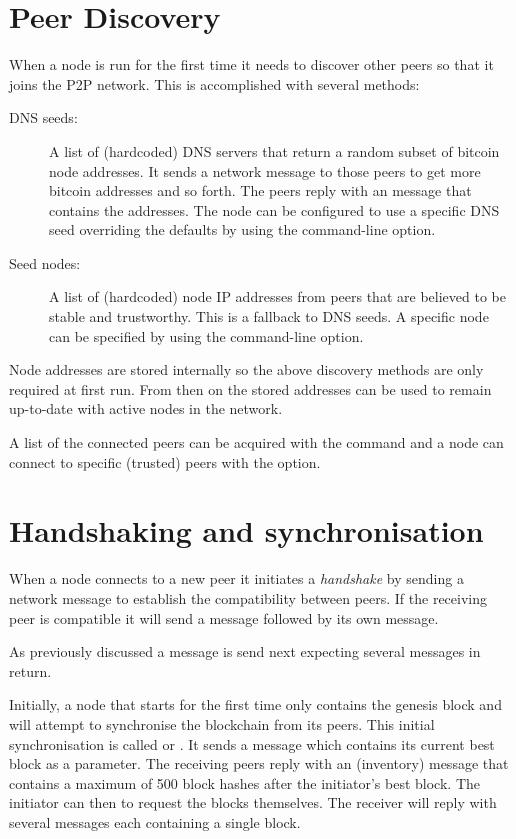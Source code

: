 \section{Peer Discovery}
When a node is run for the first time it needs to discover other peers so that it joins the P2P network. This is accomplished with several methods:

\begin{description}
\item[DNS seeds:] A list of (hardcoded) DNS servers that return a random subset of bitcoin node addresses. It sends a  network message to those peers to get more bitcoin addresses and so forth. The peers reply with an  message that contains the addresses. The node can be configured to use a specific DNS seed overriding the defaults by using the  command-line option.
\item[Seed nodes:] A list of (hardcoded) node IP addresses from peers that are believed to be stable and trustworthy. This is a fallback to DNS seeds. A specific node can be specified by using the  command-line option.
\end{description}

Node addresses are stored internally so the above discovery methods are only required at first run. From then on the stored addresses can be used to remain up-to-date with active nodes in the network.

A list of the connected peers can be acquired with the  command and a node can connect to specific (trusted) peers with the  option.


\section{Handshaking and synchronisation}
When a node connects to a new peer it initiates a \emph{handshake} by sending a  network message to establish the compatibility between peers. If the receiving peer is compatible it will send a  message followed by its own  message.

As previously discussed a  message is send next expecting several  messages in return.

Initially, a node that starts for the first time only contains the genesis block and will attempt to synchronise the blockchain from its peers. This initial synchronisation is called  or . It sends a  message which contains its current best block as a parameter. The receiving peers reply with an  (inventory) message that contains a maximum of 500 block hashes after the initiator’s best block. The initiator can then  to request the blocks themselves. The receiver will reply with several  messages each containing a single block.


